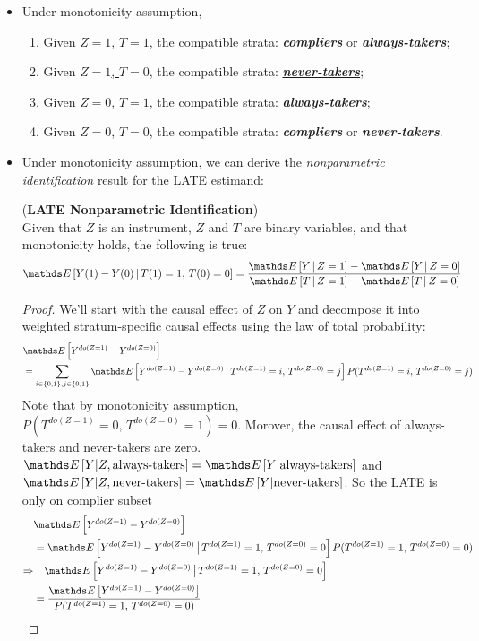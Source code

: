 \documentclass[11pt]{article}
\begin{document}
\begin{itemize}
\item Under monotonicity assumption, 
\begin{enumerate}
\item Given $Z=1$, $T=1$, the compatible strata: \textbf{\emph{compliers}} or \emph{\textbf{always-takers}};
\item Given \underline{$Z=1$, $T=0$}, the compatible strata: \underline{\textbf{\emph{never-takers}}};
\item Given \underline{$Z=0$, $T=1$}, the compatible strata: \underline{\emph{\textbf{always-takers}}};
\item Given $Z=0$, $T=0$, the compatible strata: \textbf{\emph{compliers}} or \emph{\textbf{never-takers}}.
\end{enumerate}

\item Under monotonicity assumption,  we can derive the \emph{nonparametric identification} result for the LATE estimand:
\begin{theorem} ({\textbf{LATE Nonparametric Identification}}) \citep{neal2020introduction}\\
Given that $Z$ is an instrument, $Z$ and $T$ are binary variables, and that monotonicity holds, the following is true:
\begin{align}
\E{}{Y(1) - Y(0) \,|\, T(1)=1, \, T(0)=0} &= \frac{\E{}{Y\,|\, Z=1} - \E{}{Y\,|\, Z=0}}{\E{}{T\,|\, Z=1} - \E{}{T\,|\, Z=0}}\label{eqn: late_estimate}
\end{align}
\end{theorem}
\begin{proof}
We’ll start with the causal effect of $Z$ on $Y$ and decompose it into weighted stratum-specific causal effects using the law of total probability:
\begin{align*}
&\E{}{Y^{do(Z=1)} - Y^{do(Z=0)}} \\
&= \sum_{i\in \set{0,1}, j\in \set{0,1}}\E{}{Y^{do(Z=1)} - Y^{do(Z=0)}\,\big|\,T^{do(Z=1)}=i, \, T^{do(Z=0)}=j}P(T^{do(Z=1)}=i, \, T^{do(Z=0)}=j) 
\end{align*}
Note that by monotonicity assumption, $P(T^{do(Z=1)}=0, \, T^{do(Z=0)}=1) = 0$. Morover, the causal effect of always-takers and never-takers are zero. $\E{}{Y|Z, \text{always-takers}} =\E{}{Y|\text{always-takers}}$ and $\E{}{Y|Z, \text{never-takers}} =\E{}{Y|\text{never-takers}}$.  So the LATE is only on complier subset
\begin{align}
&\E{}{Y^{do(Z=1)} - Y^{do(Z=0)}} \nonumber\\
&= \E{}{Y^{do(Z=1)} - Y^{do(Z=0)}\,\big|\,T^{do(Z=1)}=1, \, T^{do(Z=0)}=0}P(T^{do(Z=1)}=1, \, T^{do(Z=0)}=0) \nonumber\\
\Rightarrow  &\quad  \E{}{Y^{do(Z=1)} - Y^{do(Z=0)}\,\big|\,T^{do(Z=1)}=1, \, T^{do(Z=0)}=0} \nonumber\\ 
&= \frac{\E{}{Y^{do(Z=1)} - Y^{do(Z=0)}}}{P(T^{do(Z=1)}=1, \, T^{do(Z=0)}=0)} \label{eqn: ate_z_y}
\end{align}


\end{proof}
\end{itemize}
\end{document}
